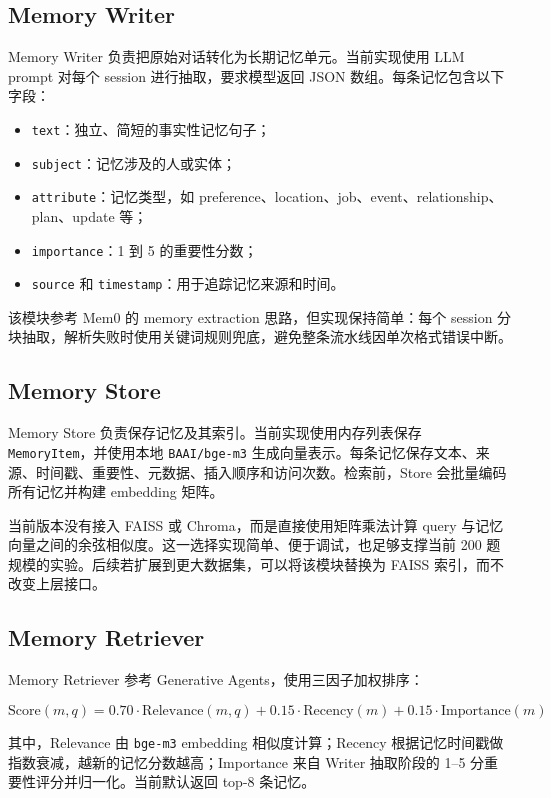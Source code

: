\documentclass[UTF8,a4paper,11pt]{ctexart}
\begin{document}
\subsection{Memory Writer}

Memory Writer 负责把原始对话转化为长期记忆单元。当前实现使用 LLM prompt 对每个 session 进行抽取，要求模型返回 JSON 数组。每条记忆包含以下字段：

\begin{itemize}
  \item \texttt{text}：独立、简短的事实性记忆句子；
  \item \texttt{subject}：记忆涉及的人或实体；
  \item \texttt{attribute}：记忆类型，如 preference、location、job、event、relationship、plan、update 等；
  \item \texttt{importance}：1 到 5 的重要性分数；
  \item \texttt{source} 和 \texttt{timestamp}：用于追踪记忆来源和时间。
\end{itemize}

该模块参考 Mem0 的 memory extraction 思路，但实现保持简单：每个 session 分块抽取，解析失败时使用关键词规则兜底，避免整条流水线因单次格式错误中断。

\subsection{Memory Store}

Memory Store 负责保存记忆及其索引。当前实现使用内存列表保存 \texttt{MemoryItem}，并使用本地 \texttt{BAAI/bge-m3} 生成向量表示。每条记忆保存文本、来源、时间戳、重要性、元数据、插入顺序和访问次数。检索前，Store 会批量编码所有记忆并构建 embedding 矩阵。

当前版本没有接入 FAISS 或 Chroma，而是直接使用矩阵乘法计算 query 与记忆向量之间的余弦相似度。这一选择实现简单、便于调试，也足够支撑当前 200 题规模的实验。后续若扩展到更大数据集，可以将该模块替换为 FAISS 索引，而不改变上层接口。

\subsection{Memory Retriever}

Memory Retriever 参考 Generative Agents，使用三因子加权排序：

\[
\mathrm{Score}(m, q) =
0.70 \cdot \mathrm{Relevance}(m, q)
+ 0.15 \cdot \mathrm{Recency}(m)
+ 0.15 \cdot \mathrm{Importance}(m)
\]

其中，Relevance 由 \texttt{bge-m3} embedding 相似度计算；Recency 根据记忆时间戳做指数衰减，越新的记忆分数越高；Importance 来自 Writer 抽取阶段的 1--5 分重要性评分并归一化。当前默认返回 top-8 条记忆。
\end{document}
